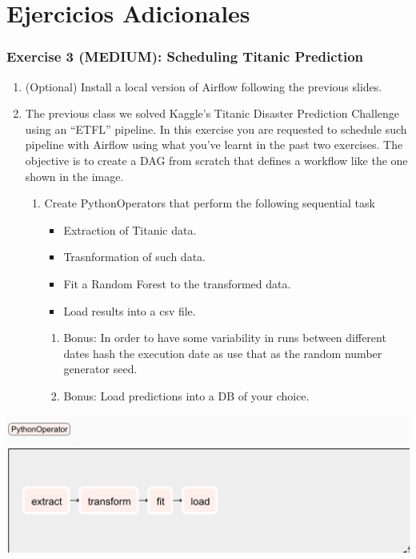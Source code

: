 \documentclass[leqno, 10pt, envcountsect]{beamer}
\numberwithin{equation}{section}
\theoremstyle{definition}
\theoremstyle{example}
\numberwithin{figure}{section}
\numberwithin{table}{section}
\let\olditem\item
\renewcommand{\item}{%
\olditem\vspace{1pt}}
\begin{document}
\section{Ejercicios Adicionales}
\label{sec:ejercicios_adicionales}

\begin{frame}[fragile=singleslide]
  \frametitle{Exercise 3 (MEDIUM): Scheduling Titanic Prediction}
  \begin{enumerate}
    \item (Optional) Install a local version of Airflow following the previous
      slides.
    \item The previous class we solved Kaggle's Titanic Disaster Prediction
      Challenge using an \enquote{ETFL} pipeline. In this exercise you are
      requested to schedule such pipeline with Airflow using what you've learnt
      in the past two exercises. The objective is to create a DAG from scratch
      that defines a workflow like the one shown in the image.
    \begin{enumerate}
      \item Create PythonOperators that perform the following sequential task
        \begin{itemize}
          \item Extraction of Titanic data.
          \item Trasnformation of such data.
          \item Fit a Random Forest to the transformed data.
          \item Load results into a csv file.
        \end{itemize}
    \begin{enumerate}
          \item Bonus: In order to have some variability in runs between different
            dates hash the execution date as use that as the random number
            generator seed.
          \item Bonus: Load predictions into a DB of your choice.
        \end{enumerate}
      \end{enumerate}
      \end{enumerate}
  \begin{center}
    \includegraphics[scale=0.2]{exercise_3.png}
  \end{center}
\end{frame}
\end{document}
